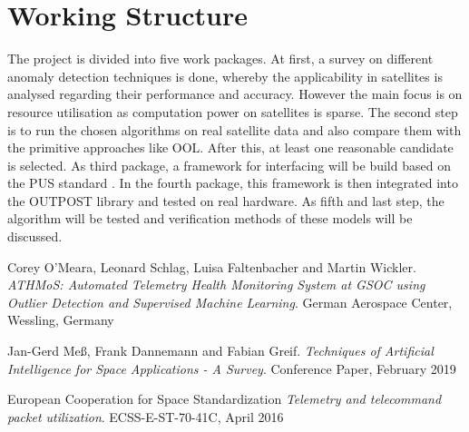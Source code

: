 \documentclass[10pt,a4paper]{scrartcl}
\begin{document}
\section*{Working Structure}
The project is divided into five work packages. At first, a survey on different anomaly detection techniques is done, whereby the applicability in satellites is analysed regarding their performance and accuracy. However the main focus is on resource utilisation as computation power on satellites is sparse. The second step is to run the chosen algorithms on real satellite data and also compare them with the primitive approaches like OOL. After this, at least one reasonable candidate is selected. As third package, a framework for interfacing will be build based on the PUS standard \cite{pus}. In the fourth package, this framework is then integrated into the OUTPOST library and tested on real hardware. As fifth and last step, the algorithm will be tested and verification methods of these models will be discussed.

\begin{thebibliography}{9}
Corey O'Meara, Leonard Schlag, Luisa Faltenbacher and Martin Wickler.
\textit{ATHMoS: Automated Telemetry Health Monitoring System at GSOC using Outlier Detection and Supervised Machine Learning}. 
German Aerospace Center, Wessling, Germany

Jan-Gerd Meß, Frank Dannemann and Fabian Greif.
\textit{Techniques of Artificial Intelligence for Space Applications - A Survey}. 
Conference Paper, February 2019

European Cooperation for Space Standardization
\textit{Telemetry and telecommand packet utilization}. 
ECSS-E-ST-70-41C, April 2016

\end{thebibliography}
\end{document}
